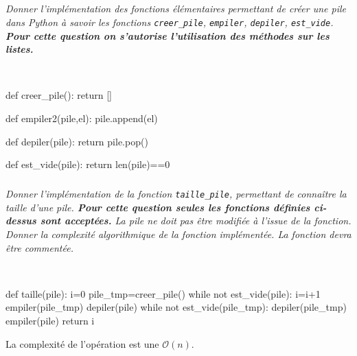\documentclass[10pt,fleqn]{article} %
\begin{document}
\subparagraph{}
\textit{Donner l'implémentation des fonctions élémentaires permettant de créer une pile dans Python à savoir les fonctions \texttt{creer\_pile}, \texttt{empiler}, \texttt{depiler}, \texttt{est\_vide}. \textbf{Pour cette question on s'autorise l'utilisation des méthodes sur les listes.}}
\ifprof
\begin{corrige}
~\\
\begin{minipage}[c]{.95\linewidth}
\begin{minipage}[c]{.2\linewidth}
\begin{python}
def creer_pile():
    return []
\end{python}
\end{minipage}\hfill
\begin{minipage}[c]{.2\linewidth}
\begin{python}
def empiler2(pile,el):
    pile.append(el)
\end{python}
\end{minipage}\hfill
\begin{minipage}[c]{.2\linewidth}
\begin{python} 
def depiler(pile):
    return pile.pop()
\end{python}
\end{minipage}\hfill
\begin{minipage}[c]{.2\linewidth}
\begin{python}
def est_vide(pile):
    return len(pile)==0
\end{python}
\end{minipage}
\end{minipage}
\end{corrige}
\else
\fi

\subparagraph{}
\textit{Donner l'implémentation de la fonction \texttt{taille\_pile}, permettant de connaître la taille d'une pile. \textbf{Pour cette question seules les fonctions définies ci-dessus sont acceptées.} La pile ne doit pas être modifiée à l'issue de la fonction. Donner la complexité algorithmique de la fonction implémentée. La fonction devra être commentée.}
\ifprof
\begin{corrige}    ~\\
\begin{python}
def taille(pile):
    i=0
    pile_tmp=creer_pile()
    while not est_vide(pile):
        i=i+1
        empiler(pile_tmp)
        depiler(pile)
    while not est_vide(pile_tmp):
        depiler(pile_tmp)
        empiler(pile)
    return i
\end{python}
La complexité de l'opération est une $\mathcal{O}(n)$.
\end{corrige}
\else
\fi
\end{document}
